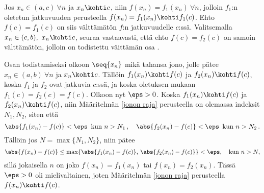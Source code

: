 \tod Jos $x_n \in (a,c)\ \forall n$ ja $x_n \kohti c$, niin $f(x_n)=f_1(x_n)\ \forall n$, 
jolloin $f_1$:n oletetun jatkuvuuden perusteella $f(x_n) = f_1(x_n) \kohti f_1(c)$. Ehto 
$f(c)=f_1(c)$ on siis välttämätön $f$:n jatkuvuudelle $c$:ssä. Valitsemalla 
$x_n \in (c,b),\ x_n \kohti c$, seuraa vastaavasti, että ehto $f(c)=f_2(c)$ on samoin 
välttämätön, jolloin on todistettu väittämän osa \fbox{$\Rightarrow$}. 

Osan \fbox{$\Leftarrow$} todistamiseksi olkoon $\seq{x_n}$ mikä tahansa jono, jolle pätee 
$x_n \in (a,b)\ \forall n$ ja $x_n \kohti c$. Tällöin $f_1(x_n) \kohti f(c)$ ja 
$f_2(x_n) \kohti f(c)$, koska $f_1$ ja $f_2$ ovat jatkuvia $c$:ssä, ja koska oletuksen mukaan 
$f_1(c)=f_2(c)=f(c)$. Olkoon nyt $\eps>0$. Koska $f_1(x_n) \kohti f(c)$ ja 
$f_2(x_n) \kohti f(c)$, niin Määritelmän \ref{jonon raja} perusteella on olemassa indeksit 
$N_1,N_2$, siten että
\[
\abs{f_1(x_n)-f(c)} < \eps\,\ \text{kun}\ n>N_1\,, \quad 
\abs{f_2(x_n)-f(c)} < \eps\,\ \text{kun}\ n>N_2\,.
\]
Tällöin jos $N = \max\{N_1,N_2\}$, niin pätee
\[
\abs{f(x_n)-f(c)} \le \max\{\abs{f_1(x_n)-f(c)},\,\abs{f_2(x_n)-f(c)}\} < \eps, 
                                                          \quad \text{kun}\ n > N,
\]
sillä jokaisella $n$ on joko $f(x_n)=f_1(x_n)$ tai $f(x_n)=f_2(x_n)$. Tässä $\eps>0$ oli 
mielivaltainen, joten Määritelmän \ref{jonon raja} perusteella $f(x_n) \kohti f(c)$. \loppu

